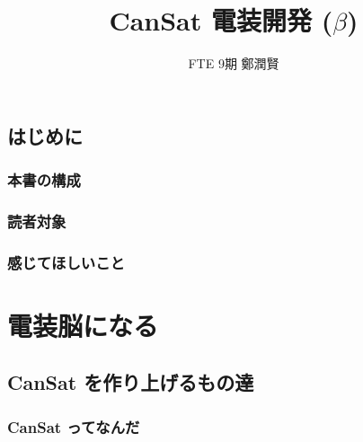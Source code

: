 \documentclass[dvipdfmx]{jsbook}
\begin{document}
\title{CanSat 電装開発 ($\beta$)}
\author{FTE 9期 \quad 鄭潤賢}
\date{}         %
\maketitle

\tableofcontents
\clearpage


\chapter{はじめに}

\section{本書の構成}

\section{読者対象}

\section{感じてほしいこと}


\clearpage

\part{電装脳になる}


\chapter{CanSat を作り上げるもの達}


\section{CanSat ってなんだ}
\label{sec:CanSatってなんだ}
\end{document}
